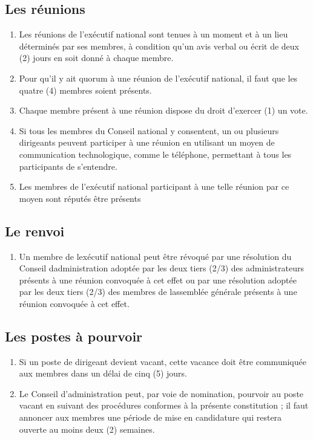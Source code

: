 \subsection{Les réunions}
\label{les-reunions-2}

\begin{enumerate}
 \item
  Les réunions de l'exécutif national sont tenues à un moment et à un lieu déterminés par ses membres, à condition qu'un avis verbal ou écrit de deux (2) jours en soit donné à chaque membre.
 \item
  Pour qu'il y ait quorum à une réunion de l'exécutif national, il faut que les quatre (4) membres soient présents.
 \item
  Chaque membre présent à une réunion dispose du droit d'exercer (1) un vote.
 \item
  Si tous les membres du Conseil national y consentent, un ou plusieurs dirigeants peuvent participer à une réunion en utilisant un moyen de communication technologique, comme le téléphone, permettant à tous les participants de s'entendre.
 \item
  Les membres de l'exécutif national participant à une telle réunion par ce moyen sont réputés être présents
\end{enumerate}

\subsection{Le renvoi}
\label{le-renvoi}

\begin{enumerate}
 \item
  Un membre de l\textquotesingle exécutif national peut être révoqué par une résolution du Conseil d\textquotesingle administration adoptée par les deux tiers (2/3) des administrateurs présents à une réunion convoquée à cet effet ou par une résolution adoptée par les deux tiers (2/3) des membres de l\textquotesingle assemblée générale présents à une réunion convoquée à cet effet.
\end{enumerate}

\subsection{Les postes à pourvoir}
\label{les-postes-a-pourvoir-2}

\begin{enumerate}
 \item
  Si un poste de dirigeant devient vacant, cette vacance doit être communiquée aux membres dans un délai de cinq (5) jours.
 \item
  Le Conseil d'administration peut, par voie de nomination, pourvoir au poste vacant en suivant des procédures conformes à la présente constitution ; il faut annoncer aux membres une période de mise en candidature qui restera ouverte au moins deux (2) semaines.
\end{enumerate}

